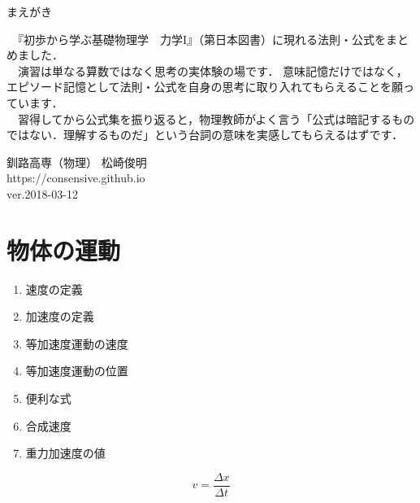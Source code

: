 \documentclass[10pt]{jarticle}
\begin{document}
\addtocounter{page}{-1}
\thispagestyle{empty}

まえがき\\

{\scriptsize
　『初歩から学ぶ基礎物理学　力学I』（第日本図書）に現れる法則・公式をまとめました．\\

　演習は単なる算数ではなく思考の実体験の場です．
意味記憶だけではなく，エピソード記憶として法則・公式を自身の思考に取り入れてもらえることを願っています．\\

　習得してから公式集を振り返ると，物理教師がよく言う「公式は暗記するものではない．理解するものだ」という台詞の意味を実感してもらえるはずです．



\vfill
\hfill 釧路高専（物理） 松崎俊明\\
\hfill https://consensive.github.io\\

\vskip-3mm \hfill ver.2018-03-12\\
}

\newpage
\addtocounter{page}{-1}
\thispagestyle{empty}
\tableofcontents



\newpage
\addtocounter{page}{-1}
\thispagestyle{empty}
\section{物体の運動}


\begin{enumerate}
\small
\itemsep-4mm
\item 速度の定義\\
\item 加速度の定義\\
\item 等加速度運動の速度\\
\item 等加速度運動の位置\\
\item 便利な式\\
\item 合成速度\\
\item 重力加速度の値
\end{enumerate}


\newpage
\[
	v = \frac{\mathit{\Delta} x}{\mathit{\Delta} t}
\]
\end{document}
